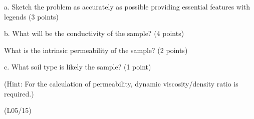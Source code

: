 \documentclass[letterpaper,10pt,english]{sphinxmanual}
\begin{document}
a.  Sketch the problem as accurately as possible providing essential features with legends (3 points)

b. What will be the conductivity of the sample? (4 points)

What is the intrinsic permeability of the sample? (2 points)

c. What soil type is likely the sample? (1 point)

(Hint: For the calculation of permeability, dynamic viscosity/density ratio is required.)

 \sphinxhyphen{}

 (L05/15)

 

\noindent{}
\end{document}
